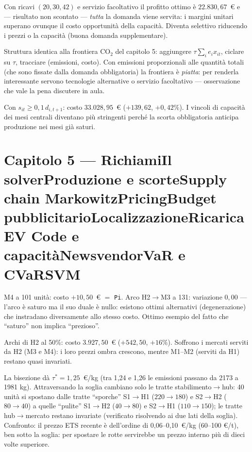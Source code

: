 \documentclass[11pt,a4paper]{article}
\newcounter{cap}
\newcounter{sol}[cap]
\newcommand{\capitolo}[1]{\setcounter{cap}{#1}\section*{Capitolo #1 --- \capnome{#1}}}
\newcommand{\capnome}[1]{%
  \ifcase#1\or\or Richiami\or Il solver\or Produzione e scorte\or Supply chain\or
  Markowitz\or Pricing\or Budget pubblicitario\or Localizzazione\or Ricarica EV\or
  Code e capacità\or Newsvendor\or VaR e CVaR\or SVM\fi}
\begin{document}
\begin{soluzione}
Con ricavi $(20, 30, 42)$ e servizio facoltativo il profitto ottimo è
$22.830{,}67$~\euro{} e --- risultato non scontato --- \emph{tutta} la domanda viene
servita: i margini unitari superano ovunque il costo opportunità della capacità.
Diventa selettivo riducendo i prezzi o la capacità (buona domanda supplementare).
\end{soluzione}

\begin{soluzione}[emissioni]
Struttura identica alla frontiera CO$_2$ del capitolo 5: aggiungere
$\tau \sum_i e_i x_{it}$, ciclare su $\tau$, tracciare (emissioni, costo). Con
emissioni proporzionali alle quantità totali (che sono fissate dalla domanda
obbligatoria) la frontiera è \emph{piatta}: per renderla interessante servono
tecnologie alternative o servizio facoltativo --- osservazione che vale la pena
discutere in aula.
\end{soluzione}

\begin{soluzione}
Con $s_{it} \ge 0{,}1\, d_{i,t+1}$: costo $33.028{,}95$~\euro{}
($+139{,}62$, $+0{,}42\%$). I vincoli di capacità dei mesi centrali diventano più
stringenti perché la scorta obbligatoria anticipa produzione nei mesi già saturi.
\end{soluzione}

\capitolo{5}

\begin{soluzione}[verifica]
M4 a 101 unità: costo $+10{,}50$~\euro{} $=$ \texttt{Pi}. Arco H2$\to$M3 a 131:
variazione $0{,}00$ --- l'arco è saturo ma il suo duale è nullo: esistono ottimi
alternativi (degenerazione) che instradano diversamente allo stesso costo. Ottimo
esempio del fatto che ``saturo'' non implica ``prezioso''.
\end{soluzione}

\begin{soluzione}
Archi di H2 al 50\%: costo $3.927{,}50$~\euro{} ($+542{,}50$, $+16\%$). Soffrono i
mercati serviti da H2 (M3 e M4): i loro prezzi ombra crescono, mentre M1--M2
(serviti da H1) restano quasi invariati.
\end{soluzione}

\begin{soluzione}
La bisezione dà $\tau^* = 1{,}25$~\euro/kg (tra 1{,}24 e 1{,}26 le emissioni passano
da 2173 a 1981 kg). Attraversando la soglia cambiano solo le tratte
stabilimento$\to$hub: 40 unità si spostano dalle tratte ``sporche'' S1$\to$H1
($220 \to 180$) e S2$\to$H2 ($80 \to 40$) a quelle ``pulite'' S1$\to$H2
($40 \to 80$) e S2$\to$H1 ($110 \to 150$); le tratte hub$\to$mercato restano
invariate (verificato risolvendo ai due lati della soglia).
Confronto: il prezzo ETS recente è dell'ordine di 0{,}06--0{,}10~\euro/kg
(60--100 \euro/t), ben sotto la soglia: per spostare le rotte servirebbe un prezzo
interno più di dieci volte superiore.
\end{soluzione}
\end{document}
